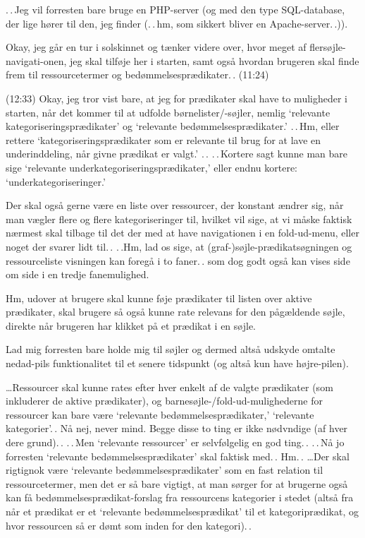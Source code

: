 \documentclass{report}
\begin{document}
.\,.\,Jeg vil forresten bare bruge en PHP-server (og med den type SQL-database, der lige hører til den, jeg finder (.\,.\,hm, som sikkert bliver en Apache-server.\,.)). 

Okay, jeg går en tur i solskinnet og tænker videre over, hvor meget af flersøjle-navigati-onen, jeg skal tilføje her i starten, samt også hvordan brugeren skal finde frem til ressourcetermer og bedømmelsesprædikater.\,. (11:24)

(12:33) Okay, jeg tror vist bare, at jeg for prædikater skal have to muligheder i starten, når det kommer til at udfolde børnelister/-søjler, nemlig `relevante kategoriseringsprædikater' og `relevante bedømmelsesprædikater.' .\,.\,Hm, eller rettere `kategoriseringsprædikater som er relevante til brug for at lave en underinddeling, når givne prædikat er valgt.' .\,. .\,.\,Kortere sagt kunne man bare sige `relevante underkategoriseringsprædikater,' eller endnu kortere: `underkategoriseringer.' 

Der skal også gerne være en liste over ressourcer, der konstant ændrer sig, når man vægler flere og flere kategoriseringer til, hvilket vil sige, at vi måske faktisk nærmest skal tilbage til det der med at have navigationen i en fold-ud-menu, eller noget der svarer lidt til.\,. .\,.Hm, lad os sige, at (graf-)søjle-prædikatsøgningen og ressourceliste visningen kan foregå i to faner.\,. som dog godt også kan vises side om side i en tredje fanemulighed. 

Hm, udover at brugere skal kunne føje prædikater til listen over aktive prædikater, skal brugere så også kunne rate relevans for den pågældende søjle, direkte når brugeren har klikket på et prædikat i en søjle.

Lad mig forresten bare holde mig til søjler og dermed altså udskyde omtalte nedad-pils funktionalitet til et senere tidspunkt (og altså kun have højre-pilen). 

\ldots Ressourcer skal kunne rates efter hver enkelt af de valgte prædikater (som inkluderer de aktive prædikater), og barnesøjle-/fold-ud-mulighederne for ressourcer kan bare være `relevante bedømmelsesprædikater,' `relevante kategorier'.\,. Nå nej, never mind. Begge disse to ting er ikke nødvndige (af hver dere grund).\,. .\,.\,Men `relevante ressourcer' er selvfølgelig en god ting.\,. .\,.\,Nå jo forresten `relevante bedømmelsesprædikater' skal faktisk med.\,. Hm.\,. \ldots Der skal rigtignok være `relevante bedømmelsesprædikater' som en fast relation til ressourcetermer, men det er så bare vigtigt, at man sørger for at brugerne også kan få bedømmelsesprædikat-forslag fra ressourcens kategorier i stedet (altså fra når et prædikat er et `relevante bedømmelsesprædikat' til et kategoriprædikat, og hvor ressourcen så er dømt som inden for den kategori).\,. 
\end{document}
